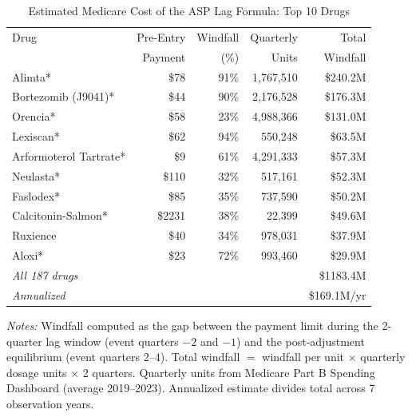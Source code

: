 \begin{table}[ht]
\centering
\begin{threeparttable}
\caption{Estimated Medicare Cost of the ASP Lag Formula: Top 10 Drugs}
\label{tab:aggregate_cost}
\begin{tabular}{lrrrr}
\toprule
Drug & Pre-Entry & Windfall & Quarterly & Total \\
 & Payment & (\%) & Units & Windfall \\
\midrule
Alimta* & \$78 & 91\% & 1,767,510 & \$240.2M \\
Bortezomib (J9041)* & \$44 & 90\% & 2,176,528 & \$176.3M \\
Orencia* & \$58 & 23\% & 4,988,366 & \$131.0M \\
Lexiscan* & \$62 & 94\% & 550,248 & \$63.5M \\
Arformoterol Tartrate* & \$9 & 61\% & 4,291,333 & \$57.3M \\
Neulasta* & \$110 & 32\% & 517,161 & \$52.3M \\
Faslodex* & \$85 & 35\% & 737,590 & \$50.2M \\
Calcitonin-Salmon* & \$2231 & 38\% & 22,399 & \$49.6M \\
Ruxience & \$40 & 34\% & 978,031 & \$37.9M \\
Aloxi* & \$23 & 72\% & 993,460 & \$29.9M \\
\midrule
\textit{All 187 drugs} & & & & \$1183.4M \\
\textit{Annualized} & & & & \$169.1M/yr \\
\bottomrule
\end{tabular}
\begin{tablenotes}[flushleft]\footnotesize
\item \textit{Notes:} Windfall computed as the gap between the payment limit during the 2-quarter lag window (event quarters $-2$ and $-1$) and the post-adjustment equilibrium (event quarters 2--4). Total windfall $=$ windfall per unit $\times$ quarterly dosage units $\times$ 2 quarters. Quarterly units from Medicare Part B Spending Dashboard (average 2019--2023). Annualized estimate divides total across 7 observation years.
\end{tablenotes}
\end{threeparttable}
\end{table}

